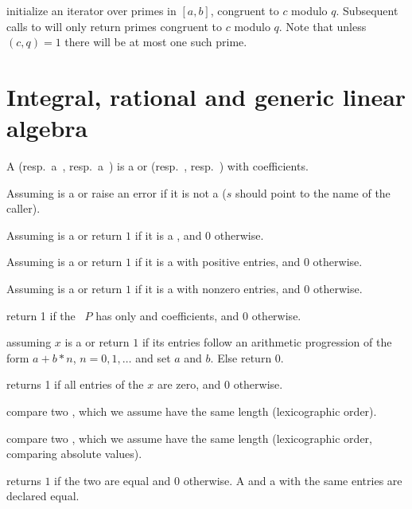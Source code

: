  initialize an iterator over primes in $[a,b]$, congruent to $c$
modulo $q$. Subsequent calls to  will only return primes
congruent to $c$ modulo $q$. Note that unless $(c,q) = 1$ there will be at
most one such prime.

\section{Integral, rational and generic linear algebra}
 A  (resp.~a~,
resp.~a~) is a  or  (resp.~,
resp.~) with  coefficients.


 Assuming  is a 
or  raise an error if it is not a  ($s$ should point to the
name of the caller).

 Assuming  is a 
or  return $1$ if it is a , and $0$ otherwise.

 Assuming  is a 
or  return $1$ if it is a  with positive entries, and $0$
otherwise.

 Assuming  is a 
or  return $1$ if it is a  with nonzero entries, and $0$
otherwise.

 return 1 if the ~$P$ has only
 and  coefficients, and 0 otherwise.

 assuming $x$ is a 
or  return $1$ if its entries follow an arithmetic progression
of the form $a + b*n$, $n = 0, 1, \dots$ and set $a$ and $b$. Else return $0$.

 returns 1 if all entries of the  $x$ are
zero, and $0$ otherwise.

 compare two , which we assume have
the same length (lexicographic order).

 compare two , which we assume have
the same length (lexicographic order, comparing absolute values).

 returns $1$ if the two  are equal
and $0$ otherwise. A  and a  with the same entries are
declared equal.

